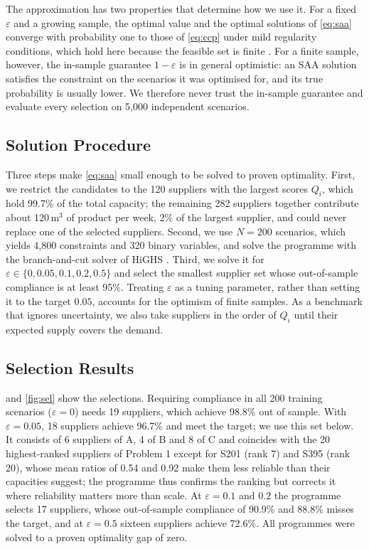 \documentclass[11pt,a4paper]{article}
\begin{document}
The approximation has two properties that determine how we use it.
For a fixed $\varepsilon$ and a growing sample, the optimal value and the optimal solutions of \cref{eq:saa} converge with probability one to those of \cref{eq:ccp} under mild regularity conditions, which hold here because the feasible set is finite \citep{luedtke2008,pagnoncelli2009}.
For a finite sample, however, the in-sample guarantee $1-\varepsilon$ is in general optimistic: an SAA solution satisfies the constraint on the scenarios it was optimised for, and its true probability is usually lower.
We therefore never trust the in-sample guarantee and evaluate every selection on 5{,}000 independent scenarios.

\subsection{Solution Procedure}
Three steps make \cref{eq:saa} small enough to be solved to proven optimality.
First, we restrict the candidates to the 120 suppliers with the largest scores $Q_i$, which hold 99.7\% of the total capacity; the remaining 282 suppliers together contribute about 120\,m$^3$ of product per week, 2\% of the largest supplier, and could never replace one of the selected suppliers.
Second, we use $N=200$ scenarios, which yields 4{,}800 constraints and 320 binary variables, and solve the programme with the branch-and-cut solver of HiGHS \citep{huangfu2018}.
Third, we solve it for $\varepsilon\in\{0,0.05,0.1,0.2,0.5\}$ and select the smallest supplier set whose out-of-sample compliance is at least 95\%.
Treating $\varepsilon$ as a tuning parameter, rather than setting it to the target $0.05$, accounts for the optimism of finite samples.
As a benchmark that ignores uncertainty, we also take suppliers in the order of $Q_i$ until their expected supply covers the demand.

\subsection{Selection Results}
 and \cref{fig:sel} show the selections.
Requiring compliance in all 200 training scenarios ($\varepsilon=0$) needs 19 suppliers, which achieve 98.8\% out of sample.
With $\varepsilon=0.05$, 18 suppliers achieve 96.7\% and meet the target; we use this set below.
It consists of 6 suppliers of A, 4 of B and 8 of C and coincides with the 20 highest-ranked suppliers of Problem 1 except for S201 (rank 7) and S395 (rank 20), whose mean ratios of 0.54 and 0.92 make them less reliable than their capacities suggest; the programme thus confirms the ranking but corrects it where reliability matters more than scale.
At $\varepsilon=0.1$ and $0.2$ the programme selects 17 suppliers, whose out-of-sample compliance of 90.9\% and 88.8\% misses the target, and at $\varepsilon=0.5$ sixteen suppliers achieve 72.6\%.
All programmes were solved to a proven optimality gap of zero.
\end{document}
